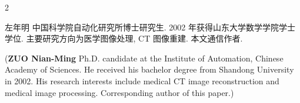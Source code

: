 \documentclass{aas}
\begin{document}
\begin{multicols*}{2}
\begin{biography}
\noindent \textsf{左年明} \quad
中国科学院自动化研究所博士研究生.
2002 年获得山东大学数学学院学士学位.
主要研究方向为医学图像处理, CT 图像重建. 本文通信作者.\\

\noindent(\textbf{ZUO Nian-Ming}\quad
Ph.D. candidate at the Institute of Automation, Chinese Academy of Sciences. He received his bachelor degree from Shandong University in 2002. His research
interests include medical CT image reconstruction and medical image processing. Corresponding author of this paper.)
\end{biography}

\end{multicols*}
\end{document}
